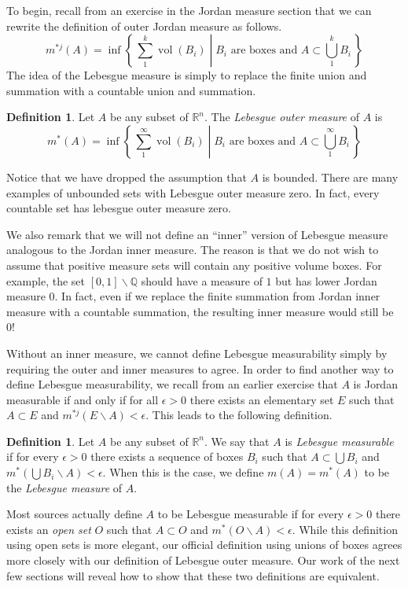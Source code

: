 \documentclass[11pt,oneside]{amsbook}
\newcommand{\set}[1]{\left\{\,#1\,\right\}}
\renewcommand{\setminus}{\smallsetminus}
\newcommand{\QQ}{{\mathbb Q}}
\newcommand{\RR}{{\mathbb R}}
\DeclareMathOperator{\vol}{vol}
\theoremstyle{definition}
\theoremstyle{plain}
\theoremstyle{definition}
\newtheorem{defn}[thm]{Definition}
\theoremstyle{remark}
\numberwithin{equation}{section}
\numberwithin{figure}{section}
\begin{document}
To begin, recall from an exercise in the Jordan measure section that we can rewrite the definition of outer Jordan measure as follows.
\[m^{*j}(A)=\inf\set{\left.\sum_1^k \vol(B_i)\;\right|\;\text{$B_i$ are boxes and }A\subset\bigcup_1^kB_i}
\]
The idea of the Lebesgue measure is simply to replace the finite union and summation with a countable union and summation.

\begin{defn}
  Let $A$ be any subset of $\RR^n$. The \emph{Lebesgue outer measure} of $A$ is
  \[m^*(A)=\inf\set{\left.\sum_1^\infty \vol(B_i)\;\right|\;\text{$B_i$ are boxes and }A\subset\bigcup_1^\infty B_i}
  \]
\end{defn}

Notice that we have dropped the assumption that $A$ is bounded. There are many examples of unbounded sets with Lebesgue outer measure zero. In fact, every countable set has lebesgue outer measure zero.

We also remark that we will not define an ``inner'' version of Lebesgue measure analogous to the Jordan inner measure. The reason is that we do not wish to assume that positive measure sets will contain any positive volume boxes. For example, the set $[0,1]\setminus\QQ$ should have a measure of $1$ but has lower Jordan measure $0$. In fact, even if we replace the finite summation from Jordan inner measure with a countable summation, the resulting inner measure would still be $0$!

Without an inner measure, we cannot define Lebesgue measurability simply by requiring the outer and inner measures to agree. In order to find another way to define Lebesgue measurability, we recall from an earlier exercise that $A$ is Jordan measurable if and only if for all $\epsilon>0$ there exists an elementary set $E$ such that $A\subset E$ and $m^{*j}(E\setminus A)<\epsilon$. This leads to the following definition.

\begin{defn}
  Let $A$ be any subset of $\RR^n$. We say that $A$ is \emph{Lebesgue measurable} if for every $\epsilon>0$ there exists a sequence of boxes $B_i$ such that $A\subset\bigcup B_i$ and $m^*(\bigcup B_i\setminus A)<\epsilon$. When this is the case, we define $m(A)=m^*(A)$ to be the \emph{Lebesgue measure} of $A$.
\end{defn}

Most sources actually define $A$ to be Lebesgue measurable if for every $\epsilon>0$ there exists an \emph{open set} $O$ such that $A\subset O$ and $m^*(O\setminus A)<\epsilon$. While this definition using open sets is more elegant, our official definition using unions of boxes agrees more closely with our definition of Lebesgue outer measure. Our work of the next few sections will reveal how to show that these two definitions are equivalent.
\end{document}
